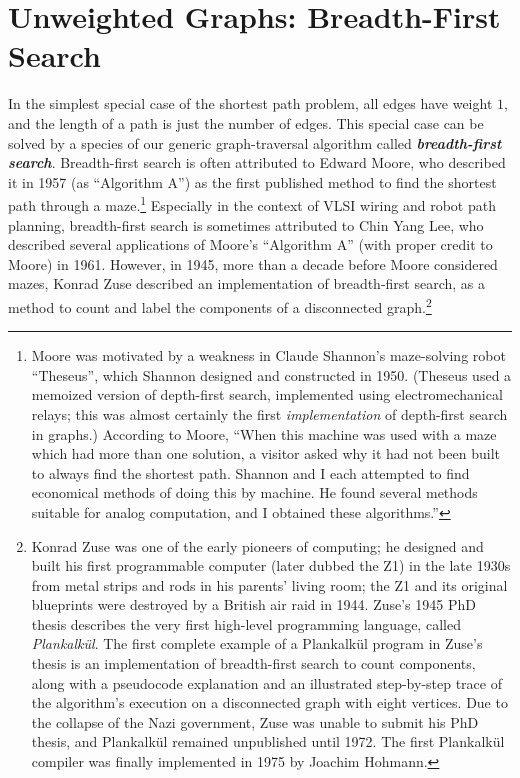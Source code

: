 \section{Unweighted Graphs: Breadth-First Search}
\label{sec:8.4}

In the simplest special case of the shortest path problem, all edges have weight $1$, and the length of a path is just the number of edges.
This special case can be solved by a species of our generic graph-traversal algorithm called \textbf{\textit{breadth-first search}}.
Breadth-first search is often attributed to Edward Moore, who described it in 1957 (as “Algorithm A”) as the first published method to find the shortest path through a maze.\footnote{Moore was motivated by a weakness in Claude Shannon’s maze-solving robot “Theseus”, which Shannon designed and constructed in 1950. (Theseus used a memoized version of depth-first search, implemented using electromechanical relays; this was almost certainly the first \textit{implementation} of depth-first search in graphs.) According to Moore, “When this machine was used with a maze which had more than one solution, a visitor asked why it had not been built to always find the shortest path. Shannon and I each attempted to find economical methods of doing this by machine. He found several methods suitable for analog computation,\footnotemark{} and I obtained these algorithms.”}
Especially in the context of VLSI wiring and robot path planning, breadth-first search is sometimes attributed to Chin Yang Lee, who described several applications of Moore’s “Algorithm A” (with proper credit to Moore) in 1961.
However, in 1945, more than a decade before Moore considered mazes, Konrad Zuse described an implementation of breadth-first search, as a method to count and label the components of a disconnected graph.\footnote{Konrad Zuse was one of the early pioneers of computing; he designed and built his first programmable computer (later dubbed the Z1) in the late 1930s from metal strips and rods in his parents’ living room; the Z1 and its original blueprints were destroyed by a British air raid in 1944. Zuse’s 1945 PhD thesis describes the very first high-level programming language, called \textit{Plankalkül}. The first complete example of a Plankalkül program in Zuse’s thesis is an implementation of breadth-first search to count components, along with a pseudocode explanation and an illustrated step-by-step trace of the algorithm’s execution on a disconnected graph with eight vertices. Due to the collapse of the Nazi government, Zuse was unable to submit his PhD thesis, and Plankalkül remained unpublished until 1972. The first Plankalkül compiler was finally implemented in 1975 by Joachim Hohmann.}

